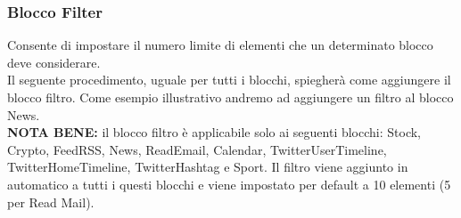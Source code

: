 \subsubsection{Blocco Filter} \label{filter}
Consente di impostare il numero limite di elementi che un determinato blocco deve considerare. \\
Il seguente procedimento, uguale per tutti i blocchi, spiegherà come aggiungere il blocco filtro. Come esempio illustrativo andremo ad aggiungere un filtro al blocco News. \\
\textbf{NOTA BENE:} il blocco filtro è applicabile solo ai seguenti blocchi: Stock, Crypto, FeedRSS, News, ReadEmail, Calendar, TwitterUserTimeline, TwitterHomeTimeline, TwitterHashtag e Sport. Il filtro viene aggiunto in automatico a tutti i questi blocchi e viene impostato per default a 10 elementi (5 per Read Mail).
\newpage
